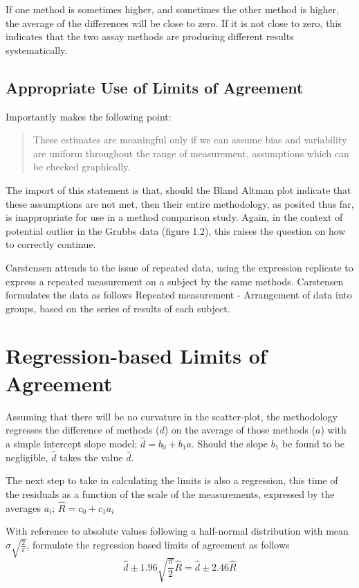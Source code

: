 \documentclass[Main.tex]{subfiles}
\begin{document}
	If one method is sometimes higher, and sometimes the other method
	is higher, the average of the differences will be close to zero.
	If it is not close to zero, this indicates that the two assay
	methods are producing different results systematically.
	
	\subsection{Appropriate Use of Limits of Agreement}
	Importantly \citet{BA99} makes the following point:
	\begin{quote}These estimates are meaningful only if we can assume
		bias and variability are uniform throughout the range of
		measurement, assumptions which can be checked graphically.
	\end{quote}
	
	The import of this statement is that, should the Bland Altman
	plot indicate that these assumptions are not met, then their
	entire methodology, as posited thus far, is inappropriate for use
	in a method comparison study. Again, in the context of potential
	outlier in the Grubbs data (figure 1.2), this raises the question
	on how to correctly continue.
	
	Carstensen attends to the issue of repeated data, using the
	expression replicate to express a repeated measurement on a
	subject by the same methods. Carstensen formulates the data as
	follows Repeated measurement - Arrangement of data into groups,
	based on the series of results of each subject.
	

	

\section{Regression-based Limits of Agreement} Assuming that
there will be no curvature in the scatter-plot, the methodology
regresses the difference of methods ($d$) on the average of those
methods ($a$) with a simple intercept slope model; $\hat{d} =
b_{0}+ b_{1}a.$ Should the slope $b_{1}$ be found to be
negligible, $\hat{d}$ takes the value $\bar{d}$.

The next step to take in calculating the limits is also a
regression, this time of the residuals as a function of the scale
of the measurements, expressed by the averages $a_{i}$;
$ \hat{R} = c_{0}+ c_{1}a_{i}$

With reference to absolute values following a half-normal
distribution with mean $\sigma\sqrt{\frac{2}{\pi}}$, \citet{BA99} formulate the regression based limits of agreement as
follows
\begin{equation}
\hat{d} \pm 1.96\sqrt{\frac{\pi}{2}}\hat{R} = \hat{d} \pm 2.46\hat{R}
\end{equation}
\end{document}
